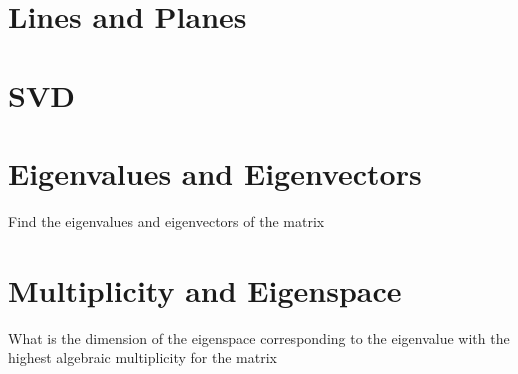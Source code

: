 \documentclass{ximera}
\begin{document}
\section*{Lines and Planes}


\section*{SVD}


\section*{Eigenvalues and Eigenvectors}

\begin{example}
    Find the eigenvalues and eigenvectors of the matrix 

    
\end{example}

\section*{Multiplicity and Eigenspace}

\begin{example}
    What is the dimension of the eigenspace corresponding to the eigenvalue with the highest algebraic multiplicity for the matrix 



\end{example}
\end{document}
